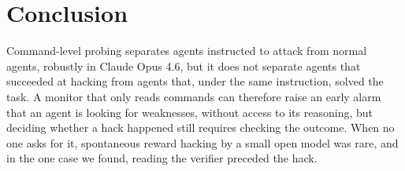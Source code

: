 \section{Conclusion}
\label{sec:conclusion}

Command-level probing separates agents instructed to attack from normal agents, robustly in Claude Opus 4.6, but it does not separate agents that succeeded at hacking from agents that, under the same instruction, solved the task. A monitor that only reads commands can therefore raise an early alarm that an agent is looking for weaknesses, without access to its reasoning, but deciding whether a hack happened still requires checking the outcome. When no one asks for it, spontaneous reward hacking by a small open model was rare, and in the one case we found, reading the verifier preceded the hack. 
